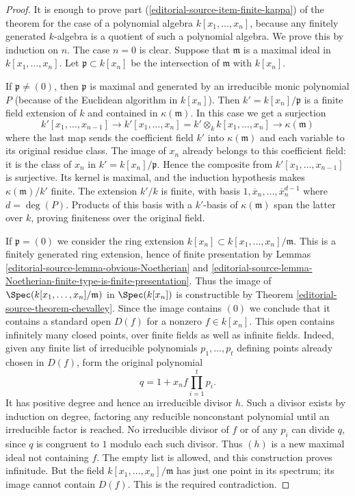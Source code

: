 \begin{proof}
It is enough to prove part (\ref{editorial-source-item-finite-kappa}) of
the theorem for the case of a polynomial
algebra $k[x_1, \ldots, x_n]$, because any finitely generated
$k$-algebra is a quotient of such a polynomial algebra.
We prove this by induction on $n$. The case $n = 0$ is clear.
Suppose that $\mathfrak m$ is a maximal ideal in $k[x_1, \ldots, x_n]$.
Let $\mathfrak p \subset k[x_n]$ be the intersection
of $\mathfrak m$ with $k[x_n]$.

\medskip\noindent
If $\mathfrak p \not = (0)$,
then $\mathfrak p$ is maximal and generated by an irreducible
monic polynomial $P$ (because of the Euclidean algorithm
in $k[x_n]$). Then
$k' = k[x_n]/\mathfrak p$ is a finite field extension of $k$
and contained in $\kappa(\mathfrak m)$. In this case
we get a surjection
$$
k'[x_1, \ldots, x_{n-1}]
\to
k'[x_1, \ldots, x_n] =
k' \otimes_k k[x_1, \ldots, x_n]
\longrightarrow
\kappa(\mathfrak m)
$$
where the last map sends the coefficient field $k'$ into
$\kappa(\mathfrak m)$ and each variable to its original residue
class. The image of $x_n$ already belongs to this coefficient field:
it is the class of $x_n$ in $k'=k[x_n]/\mathfrak p$. Hence the
composite from $k'[x_1,\ldots,x_{n-1}]$ is surjective. Its kernel
is maximal, and the induction hypothesis makes
$\kappa(\mathfrak m)/k'$ finite. The extension $k'/k$ is finite,
with basis $1,\overline{x}_n,\ldots,\overline{x}_n^{d-1}$ where
$d=\deg(P)$. Products of this basis with a $k'$-basis of
$\kappa(\mathfrak m)$ span the latter over $k$, proving finiteness
over the original field.

\medskip\noindent
If $\mathfrak p = (0)$ we consider the ring
extension $k[x_n] \subset k[x_1, \ldots, x_n]/\mathfrak m$.
This is a finitely generated ring extension, hence
of finite presentation by
Lemmas \ref{editorial-source-lemma-obvious-Noetherian} and
\ref{editorial-source-lemma-Noetherian-finite-type-is-finite-presentation}.
Thus the image of $\Spec(k[x_1, \ldots, x_n]/\mathfrak m)$
in $\Spec(k[x_n])$ is constructible by
Theorem \ref{editorial-source-theorem-chevalley}. Since the image
contains $(0)$ we conclude that it contains a standard
open $D(f)$ for a nonzero $f\in k[x_n]$.
This open contains infinitely many closed points, over finite fields
as well as infinite fields. Indeed, given any finite list of
irreducible polynomials $p_1,\ldots,p_t$ defining points already
chosen in $D(f)$, form the original polynomial
$$
q=1+x_n f\prod_{i=1}^t p_i.
$$
It has positive degree and hence an irreducible divisor $h$.
Such a divisor exists by induction on degree, factoring any reducible
nonconstant polynomial until an irreducible factor is reached.
No irreducible divisor of $f$ or of any $p_i$ can divide $q$, since
$q$ is congruent to $1$ modulo each such divisor. Thus $(h)$ is a
new maximal ideal not containing $f$. The empty list is allowed,
and this construction proves infinitude. But the field
$k[x_1,\ldots,x_n]/\mathfrak m$ has just one point in its spectrum;
its image cannot contain $D(f)$. This is the required contradiction.


\end{proof}
